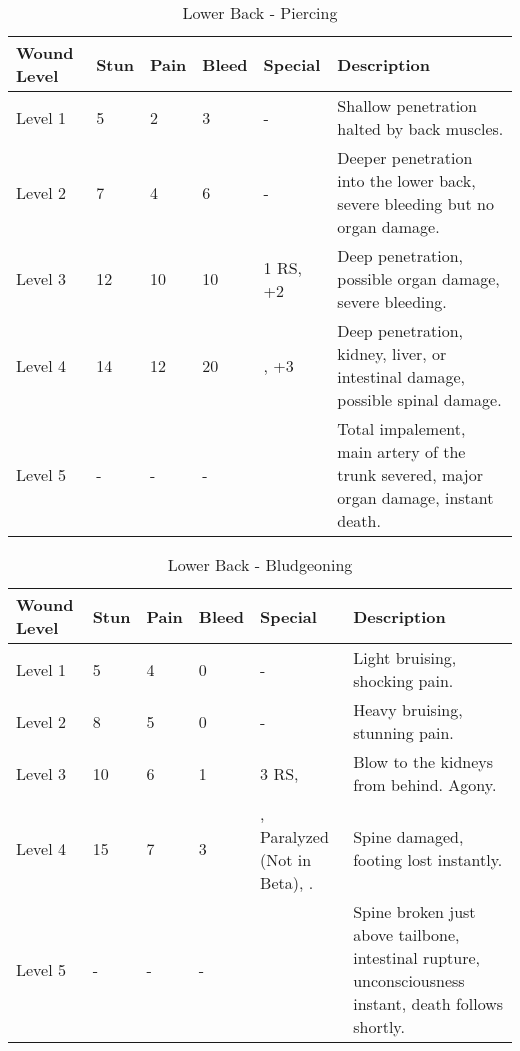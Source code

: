 \documentclass[oneside,11pt,english]{book}
\begin{document}
\begin{table}[!hb] %
	\caption{Lower Back - Piercing}
	\label{wound:Lower Back - Piercing}
	\begin{tabu} to 
Wound Level &Stun &Pain &Bleed &Special &Description\\\toprule
Level 1 &5 &2 &3 &- &Shallow penetration halted by back muscles.\\
Level 2& 7& 4& 6& - &Deeper penetration into the lower back, severe bleeding but no organ damage.\\
Level 3& 12& 10& 10
	& 1 RS, \newline
		 +2
	&Deep penetration, possible organ damage, severe bleeding.\\
Level 4& 14& 12& 20
	&, \newline
		 +3
	&Deep penetration, kidney, liver, or intestinal damage, possible spinal damage.\\
Level 5& - &- &- & &Total impalement, main artery of the trunk severed, major organ damage, instant death.\\
	\end{tabu}
\end{table}

\begin{table}[!hb] %
	\caption{Lower Back - Bludgeoning}
	\label{wound:Lower Back - Bludgeoning}
	\begin{tabu} to 
Wound Level &Stun &Pain &Bleed &Special &Description\\\toprule
Level 1& 5& 4& 0& - &Light bruising, shocking pain.\\
Level 2& 8& 5& 0& - &Heavy bruising, stunning pain.\\
Level 3& 10& 6& 1 
	& 3 RS, \newline
	&Blow to the kidneys from behind. Agony.\\
Level 4& 15& 7& 3
	&, \newline
		Paralyzed (Not in Beta), \newline
		.
	&Spine damaged, footing lost instantly.\\
Level 5& - &- &- & &Spine broken just above tailbone, intestinal rupture, unconsciousness instant, death follows shortly. \\
	\end{tabu}
\end{table}
\end{document}
